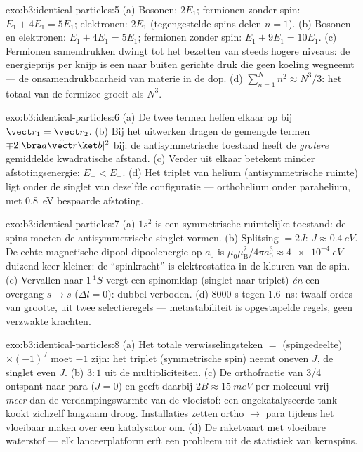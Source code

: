 \begin{solution}{exo:b3:identical-particles:5}
(a) Bosonen: $2E_1$; fermionen zonder spin: $E_1 + 4E_1 = 5E_1$;
elektronen: $2E_1$ (tegengestelde spins delen $n = 1$). (b) Bosonen en
elektronen: $E_1 + 4E_1 = 5E_1$; fermionen zonder spin: $E_1 + 9E_1 =
10E_1$. (c) Fermionen samendrukken dwingt tot het bezetten van steeds
hogere niveaus: de energieprijs per knijp is een naar buiten gerichte druk
die geen koeling wegneemt --- de onsamendrukbaarheid van materie in de
dop. (d) $\sum_{n=1}^N n^2 \approx N^3/3$: het totaal van de fermizee
groeit als $N^3$.
\end{solution}

\begin{solution}{exo:b3:identical-particles:6}
(a) De twee termen heffen elkaar op bij $\vect r_1 = \vect r_2$. (b) Bij
het uitwerken dragen de gemengde termen $\mp2|\bra a\hat{\vect r}\ket b|^2$ bij: de antisymmetrische toestand heeft de \emph{grotere}
gemiddelde kwadratische afstand. (c) Verder uit elkaar betekent minder
afstotingsenergie: $E_- <
E_+$. (d) Het triplet van helium
(antisymmetrische ruimte) ligt onder de singlet van dezelfde configuratie
--- orthohelium onder parahelium, met \qty{0.8}{eV} bespaarde afstoting.
\end{solution}

\begin{solution}{exo:b3:identical-particles:7}
(a) $1s^2$ is een symmetrische ruimtelijke toestand: de spins moeten de
antisymmetrische singlet vormen. (b) Splitsing $= 2J$: $J \approx
\qty{0.4}{eV}$. De echte magnetische dipool-dipoolenergie op $a_0$ is
$\mu_0\mu_{\text{B}}^2/4\pi a_0^3 \approx \qty{4e-4}{eV}$ --- duizend keer
kleiner: de ``spinkracht'' is elektrostatica in de kleuren van de spin.
(c) Vervallen naar $1\,^1S$ vergt een spinomklap (singlet naar triplet)
\emph{én} een overgang $s \to s$ ($\Delta l =
0$): dubbel verboden. (d)
$8000$ s tegen \qty{1.6}{ns}: twaalf ordes van grootte, uit twee
selectieregels --- metastabiliteit is opgestapelde regels, geen verzwakte
krachten.
\end{solution}

\begin{solution}{exo:b3:identical-particles:8}
(a) Het totale verwisselingsteken $=$ (spingedeelte) $\times (-1)^J$ moet
$-1$ zijn: het triplet (symmetrische spin) neemt oneven $J$, de singlet
even $J$. (b) $3:1$ uit de multipliciteiten. (c) De orthofractie van 3/4
ontspant naar para ($J = 0$) en geeft daarbij $2B \approx \qty{15}{meV}$
per molecuul vrij --- \emph{meer} dan de verdampingswarmte van de
vloeistof: een ongekatalyseerde tank kookt zichzelf langzaam droog.
Installaties zetten ortho $\to$ para tijdens het vloeibaar maken over een
katalysator om. (d) De raketvaart met vloeibare waterstof --- elk
lanceerplatform erft een probleem uit de statistiek van kernspins.
\end{solution}

